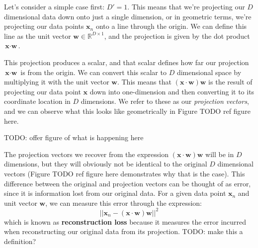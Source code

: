 
Let's consider a simple case first: $D'=1$. This means that we're projecting our $D$ dimensional data down onto just a single dimension, or in geometric terms, we're projecting our data points $\textbf{x}_{n}$ onto a line through the origin. We can define this line as the unit vector $\textbf{w} \in \mathbb{R}^{D \times 1}$, and the projection is given by the dot product $\textbf{x} \cdot \textbf{w}$.


This projection produces a scalar, and that scalar defines how far our projection $\textbf{x} \cdot \textbf{w}$ is from the origin. We can convert this scalar to $D$ dimensional space by multiplying it with the unit vector $\textbf{w}$. This means that $(\textbf{x} \cdot \textbf{w})\textbf{w}$ is the result of projecting our data point $\textbf{x}$ down into one-dimension and then converting it to its coordinate location in $D$ dimensions. We refer to these as our \textit{projection vectors}, and we can observe what this looks like geometrically in Figure TODO ref figure here.

TODO: offer figure of what is happening here

The projection vectors we recover from the expression $(\textbf{x} \cdot \textbf{w})\textbf{w}$ will be in $D$ dimensions, but they will obviously not be identical to the original $D$ dimensional vectors (Figure TODO ref figure here demonstrates why that is the case). This difference between the original and projection vectors can be thought of as error, since it is information lost from our original data. For a given data point $\textbf{x}_{n}$ and unit vector $\textbf{w}$, we can measure this error through the expression:
\begin{equation} \label{reconstruction-loss}
	||\textbf{x}_{n} - (\textbf{x} \cdot \textbf{w})\textbf{w}||^{2}
\end{equation}
which is known as \textbf{reconstruction loss} because it measures the error incurred when reconstructing our original data from its projection. TODO: make this a definition?

